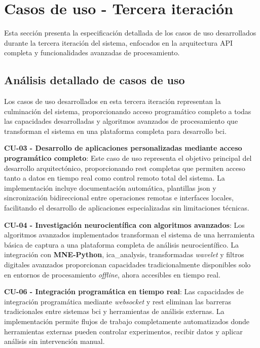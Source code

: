 \section{Casos de uso - Tercera iteración}
\label{sec:casos_uso_it3}

Esta sección presenta la especificación detallada de los casos de uso desarrollados durante la tercera iteración del sistema, enfocados en la arquitectura API completa y funcionalidades avanzadas de procesamiento.

\subsection{Análisis detallado de casos de uso}
\label{subsec:analisis_detallado_casos_uso_it3}

Los casos de uso desarrollados en esta tercera iteración representan la culminación del sistema, proporcionando acceso programático completo a todas las capacidades desarrolladas y algoritmos avanzados de procesamiento que transforman el sistema en una plataforma completa para desarrollo \acrshort{bci}.

\textbf{CU-03 - Desarrollo de aplicaciones personalizadas mediante acceso programático completo}: Este caso de uso representa el objetivo principal del desarrollo arquitectónico, proporcionando  \acrshort{rest} completas que permiten acceso tanto a datos en tiempo real como control remoto total del sistema. La implementación incluye documentación automática, plantillas \acrshort{json} y sincronización bidireccional entre operaciones remotas e interfaces locales, facilitando el desarrollo de aplicaciones especializadas sin limitaciones técnicas.

\textbf{CU-04 - Investigación neurocientífica con algoritmos avanzados}: Los algoritmos avanzados implementados transforman el sistema de una herramienta básica de captura a una plataforma completa de análisis neurocientífico. La integración con \textbf{MNE-Python}, \gls{ica_analysis}, transformadas \textit{\gls{wavelet}} y filtros digitales avanzados proporcionan capacidades tradicionalmente disponibles solo en entornos de procesamiento \textit{offline}, ahora accesibles en tiempo real.

\textbf{CU-06 - Integración programática en tiempo real}: Las capacidades de integración programática mediante \textit{\gls{websocket}} y  \acrshort{rest} eliminan las barreras tradicionales entre sistemas \acrshort{bci} y herramientas de análisis externas. La implementación permite flujos de trabajo completamente automatizados donde herramientas externas pueden controlar experimentos, recibir datos y aplicar análisis sin intervención manual.

